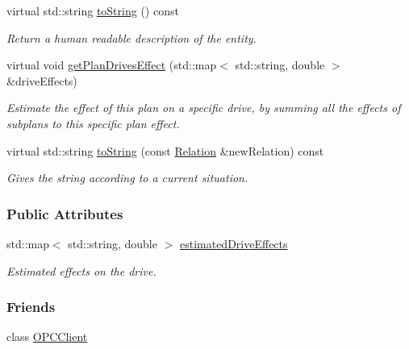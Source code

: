\begin{DoxyCompactItemize}
virtual std\+::string \hyperlink{group__icubclient__representations_a725d45d77d48e73135956e1aadfe3889}{to\+String} () const
\begin{DoxyCompactList}\small\item\em Return a human readable description of the entity. \end{DoxyCompactList}\item 
virtual void \hyperlink{group__icubclient__representations_a627e81e6a323fe17c1a240d3a06f9a75}{get\+Plan\+Drives\+Effect} (std\+::map$<$ std\+::string, double $>$ \&drive\+Effects)
\begin{DoxyCompactList}\small\item\em Estimate the effect of this plan on a specific drive, by summing all the effects of subplans to this specific plan effect. \end{DoxyCompactList}\item 
virtual std\+::string \hyperlink{group__icubclient__representations_a0db8acde84f6986ea158f865ba752d40}{to\+String} (const \hyperlink{group__icubclient__representations_classicubclient_1_1Relation}{Relation} \&new\+Relation) const
\begin{DoxyCompactList}\small\item\em Gives the string according to a current situation. \end{DoxyCompactList}\end{DoxyCompactItemize}
\subsubsection*{Public Attributes}
\begin{DoxyCompactItemize}
\item 
std\+::map$<$ std\+::string, double $>$ \hyperlink{group__icubclient__representations_a097956811c22b237972880efab649438}{estimated\+Drive\+Effects}
\begin{DoxyCompactList}\small\item\em Estimated effects on the drive. \end{DoxyCompactList}\end{DoxyCompactItemize}
\subsubsection*{Friends}
\begin{DoxyCompactItemize}
\item 
class \hyperlink{group__icubclient__representations_a80f0caa9925206967111a3d2713874a2}{O\+P\+C\+Client}
\end{DoxyCompactItemize}
